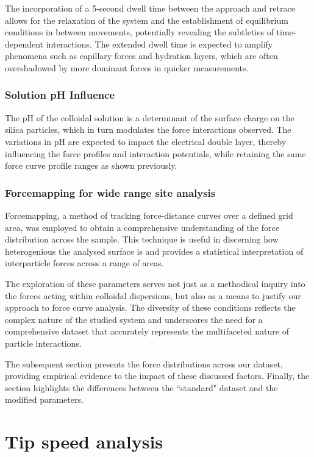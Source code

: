 The incorporation of a 5-second dwell time between the approach and retrace allows for the relaxation of the system and the establishment of equilibrium conditions in between movements, potentially revealing the subtleties of time-dependent interactions. The extended dwell time is expected to amplify phenomena such as capillary forces and hydration layers, which are often overshadowed by more dominant forces in quicker measurements.

\subsubsection{Solution pH Influence}

The pH of the colloidal solution is a determinant of the surface charge on the silica particles, which in turn modulates the force interactions observed. The variations in pH are expected to impact the electrical double layer, thereby influencing the force profiles and interaction potentials, while retaining the same force curve profile ranges as shown previously.

\subsubsection{Forcemapping for wide range site analysis}

Forcemapping, a method of tracking force-distance curves over a defined grid area, was employed to obtain a comprehensive understanding of the force distribution across the sample. This technique is useful in discerning how heterogenious the analysed surface is and provides a statistical interpretation of interparticle forces across a range of areas.

The exploration of these parameters serves not just as a methodical inquiry into the forces acting within colloidal dispersions, but also as a means to justify our approach to force curve analysis. The diversity of these conditions reflects the complex nature of the studied system and underscores the need for a comprehensive dataset that accurately represents the multifaceted nature of particle interactions.

The subsequent section presents the force distributions across our dataset, providing empirical evidence to the impact of these discussed factors. Finally, the section highlights the differences between the ``standard" dataset and the modified parameters.

\section{Tip speed analysis}


